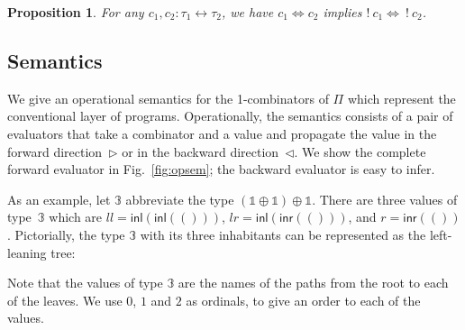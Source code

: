\documentclass[a4paper,USenglish]{lipics-v2016-utf8x}
\newcommand{\iso}{\leftrightarrow}
\newcommand{\isotwo}{\Leftrightarrow}
\newcommand{\inl}[1]{\textsf{inl}(#1)}
\newcommand{\inr}[1]{\textsf{inr}(#1)}
\newcommand{\ot}{\mathbb{1}}
\newcommand{\unitv}{()}
\newtheorem{proposition}{Proposition}
\begin{document}
\begin{proposition}
For any $c_1,c_2 : \tau_1 \iso \tau_2$, we have $c_1 \isotwo c_2$ implies
$!~c_1 \isotwo ~!~c_2$.
\end{proposition}

\subsection{Semantics}
\label{sec:pisem}

We give an operational semantics for the 1-combinators of $\Pi$ which
represent the conventional layer of programs.  Operationally, the
semantics consists of a pair of evaluators that
take a combinator and a value and propagate the value in the forward
direction~$\triangleright$ or in the backward
direction~$\triangleleft$. We show the complete forward evaluator in
Fig.~\ref{fig:opsem}; the backward evaluator is easy to infer.

As an example, let $\mathbb{3}$ abbreviate the type
$(\ot \oplus \ot) \oplus \ot$. There are three values of
type~$\mathbb{3}$ which are $ll=\inl{\inl{\unitv}}$,
$lr=\inl{\inr{\unitv}}$, and $r=\inr{\unitv}$. Pictorially, the type
$\mathbb{3}$ with its three inhabitants can be represented as the
left-leaning tree:
\begin{center}
\end{center}
Note that the values of type $\mathbb{3}$ are the names of
the paths from the root to each of the leaves.  We use
$0$, $1$ and $2$ as ordinals, to give an order to each
of the values.
\end{document}
